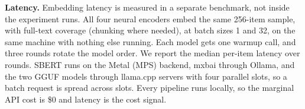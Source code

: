 \textbf{Latency.} Embedding latency is measured in a separate
benchmark, not inside the experiment runs. All four neural encoders
embed the same 256-item sample, with full-text coverage (chunking where
needed), at batch sizes 1 and 32, on the same machine with nothing else
running. Each model gets one warmup call, and three rounds rotate the
model order. We report the median per-item latency over rounds.
SBERT runs on the Metal (MPS) backend, mxbai through Ollama, and the
two GGUF models through llama.cpp servers with four parallel slots,
so a batch request is spread across slots. Every
pipeline runs locally, so the marginal API cost is \$0 and latency is
the cost signal.
